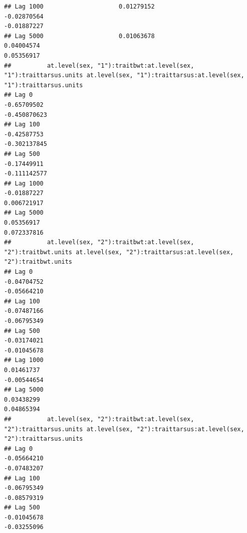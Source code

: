 \documentclass[
  12pt,
]{book}
\begin{document}
\begin{verbatim}
## Lag 1000                     0.01279152                                                   -0.02870564                                                      -0.01887227
## Lag 5000                     0.01063678                                                    0.04004574                                                       0.05356917
##          at.level(sex, "1"):traitbwt:at.level(sex, "1"):traittarsus.units at.level(sex, "1"):traittarsus:at.level(sex, "1"):traittarsus.units
## Lag 0                                                         -0.65709502                                                        -0.450870623
## Lag 100                                                       -0.42587753                                                        -0.302137845
## Lag 500                                                       -0.17449911                                                        -0.111142577
## Lag 1000                                                      -0.01887227                                                         0.006721917
## Lag 5000                                                       0.05356917                                                         0.072337816
##          at.level(sex, "2"):traitbwt:at.level(sex, "2"):traitbwt.units at.level(sex, "2"):traittarsus:at.level(sex, "2"):traitbwt.units
## Lag 0                                                      -0.04704752                                                      -0.05664210
## Lag 100                                                    -0.07487166                                                      -0.06795349
## Lag 500                                                    -0.03174021                                                      -0.01045678
## Lag 1000                                                    0.01461737                                                      -0.00544654
## Lag 5000                                                    0.03438299                                                       0.04865394
##          at.level(sex, "2"):traitbwt:at.level(sex, "2"):traittarsus.units at.level(sex, "2"):traittarsus:at.level(sex, "2"):traittarsus.units
## Lag 0                                                         -0.05664210                                                         -0.07483207
## Lag 100                                                       -0.06795349                                                         -0.08579319
## Lag 500                                                       -0.01045678                                                         -0.03255096

\end{verbatim}
\end{document}
